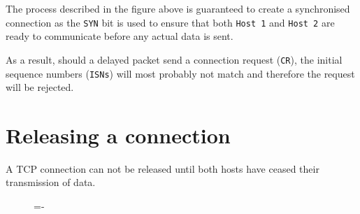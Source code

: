\documentclass[a4paper]{systems-software}
\begin{document}
The process described in the figure above is guaranteed to create a synchronised connection as the \texttt{SYN} bit is used to ensure that both \texttt{Host 1} and \texttt{Host 2} are ready to communicate before any actual data is sent.

As a result, should a delayed packet send a connection request (\texttt{CR}), the initial sequence numbers (\texttt{ISNs}) will most probably not match and therefore the request will be rejected.



\section*{Releasing a connection}

A TCP connection can not be released until both hosts have ceased their transmission of data.

\begin{figure}[H]
	\lineskip=-\fboxrule
\end{figure}
\end{document}
